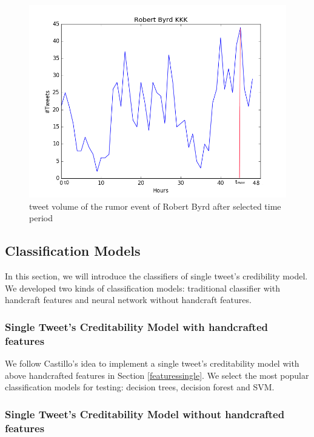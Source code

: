 \begin{figure}[!h]
\centering
\includegraphics[width=0.7\columnwidth]{images/Robert_Byrd_KKK.png}
\caption{tweet volume of the rumor event of Robert Byrd after selected time period}
\label{fig:KKK_part}
\end{figure}
\newpage
\subsection{Classification Models} %
In this section, we will introduce the classifiers of single tweet's credibility model. We developed two kinds of classification models: traditional classifier with handcraft features and neural network without handcraft features.
\subsubsection{Single Tweet's Creditability Model with handcrafted features} %
We follow Castillo's \cite{gupta2014tweetcred} idea to implement a single tweet's creditability model with above handcrafted features in Section \ref{featuressingle}. We select the most popular classification models for testing: decision trees, decision forest and SVM.  

  \subsubsection{Single Tweet's Creditability Model without handcrafted features} 
\label{sec:single_nofeature}

